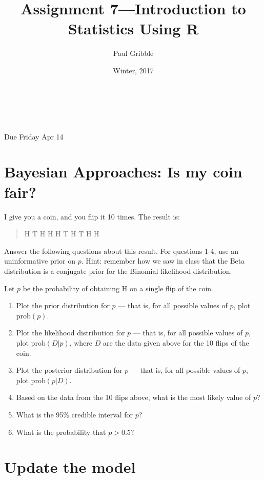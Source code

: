\documentclass[10pt]{article}
\title{Assignment 7---Introduction to Statistics Using R}
\author{Paul Gribble}
\date{Winter, 2017}
\makeatletter
\renewcommand{\maketitle}{
\begin{flushleft}          %
{\Large\sffamily\bfseries\@title}   %
\vspace{3ex}\\            %
{\normalsize\sffamily\@author}           %
\vspace{0ex}\\             %
\normalsize\sffamily\@date                     %
\vspace{5ex}              %
\end{flushleft}
}
\makeatother
\begin{document}
\maketitle

\thispagestyle{empty}

{\flushleft \sffamily * Due Friday Apr 14}

\section*{Bayesian Approaches: Is my coin fair?}

I give you a coin, and you flip it 10 times. The result is:

\begin{quote}
H T H H H T H T H H
\end{quote}

Answer the following questions about this result. For questions 1-4,
use an uninformative prior on $p$. Hint: remember how we saw in class
that the Beta distribution is a conjugate prior for the Binomial
likelihood distribution.

Let $p$ be the probability of obtaining H on a single flip of the
coin.

\begin{enumerate}

\item Plot the prior distribution for $p$ --- that is, for all
  possible values of $p$, plot $\mathrm{prob}(p)$.

\item Plot the likelihood distribution for $p$ --- that is, for all
  possible values of $p$, plot $\mathrm{prob}(D|p)$, where $D$ are the
  data given above for the 10 flips of the coin.

\item Plot the posterior distribution for $p$ --- that is, for all
  possible values of $p$, plot $\mathrm{prob}(p|D)$.

\item Based on the data from the 10 flips above, what is the
  most likely value of $p$?

\item What is the 95\% credible interval for $p$?

\item What is the probability that $p > 0.5$?

\end{enumerate}

\newpage
\section*{Update the model}
\end{document}
